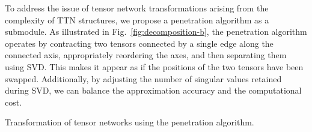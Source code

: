 \documentclass[12pt,dvipdfmx,twoside,openright]{report}
\begin{document}
To address the issue of tensor network transformations arising from the complexity of TTN structures, we propose a penetration algorithm as a submodule.
As illustrated in Fig.~\ref{fig:decomposition-b}, the penetration algorithm operates by contracting two tensors connected by a single edge along the connected axis, appropriately reordering the axes, and then separating them using SVD.
This makes it appear as if the positions of the two tensors have been swapped.
Additionally, by adjusting the number of singular values retained during SVD, we can balance the approximation accuracy and the computational cost.

\begin{algorithm}[tbp]
 \caption{Transformation of tensor networks using the penetration algorithm.}
 \label{algorithm:transformation}
\end{algorithm}
\end{document}
